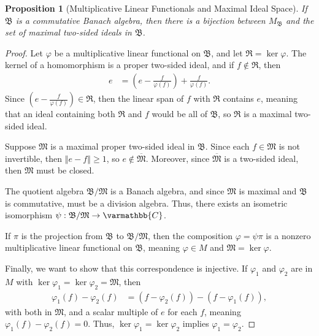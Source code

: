 \documentclass[10pt]{extarticle}
\newcommand{\C}{\mathbb{C}}
\newcommand{\norm}[1]{\left\Vert #1\right\Vert}
\theoremstyle{plain}
\newtheorem*{proposition}{Proposition}
\theoremstyle{definition}
\theoremstyle{note}
\renewcommand*{\mathbb}[1]{\varmathbb{#1}}
\renewcommand{\newline}{\hfill\break}
\begin{document}
\begin{proposition}[Multiplicative Linear Functionals and Maximal Ideal Space]
  If $\mathfrak{B}$ is a commutative Banach algebra, then there is a bijection between $M_{\mathfrak{B}}$ and the set of maximal two-sided ideals in $\mathfrak{B}$.
\end{proposition}
\begin{proof}
  Let $\varphi$ be a multiplicative linear functional on $\mathfrak{B}$, and let $\mathfrak{R} =\ker\varphi$. The kernel of a homomorphism is a proper two-sided ideal, and if $f\notin \mathfrak{R}$, then
  \begin{align*}
    e &= \left(e - \frac{f}{\varphi(f)}\right) + \frac{f}{\varphi\left(f\right)}.
  \end{align*}
  Since $\left(e - \frac{f}{\varphi(f)}\right)\in \mathfrak{R}$, then the linear span of $f$ with $\mathfrak{R}$ contains $e$, meaning that an ideal containing both $\mathfrak{R}$ and $f$ would be all of $\mathfrak{B}$, so $\mathfrak{R}$ is a maximal two-sided ideal.\newline

  Suppose $\mathfrak{M}$ is a maximal proper two-sided ideal in $\mathfrak{B}$. Since each $f\in \mathfrak{M}$ is not invertible, then $\norm{e - f} \geq 1$, so $e\notin \overline{\mathfrak{M}}$. Moreover, since $\overline{\mathfrak{M}}$ is a two-sided ideal, then $\mathfrak{M}$ must be closed.\newline

  The quotient algebra $\mathfrak{B}/\mathfrak{M}$ is a Banach algebra, and since $\mathfrak{M}$ is maximal and $\mathfrak{B}$ is commutative, must be a division algebra. Thus, there exists an isometric isomorphism $\psi: \mathfrak{B}/\mathfrak{M}\rightarrow \C$.\newline

  If $\pi$ is the projection from $\mathfrak{B}$ to $\mathfrak{B}/\mathfrak{M}$, then the composition $\varphi = \psi \pi$ is a nonzero multiplicative linear functional on $\mathfrak{B}$, meaning $\varphi \in M$ and $\mathfrak{M} = \ker\varphi$.\newline

  Finally, we want to show that this correspondence is injective. If $\varphi_1$ and $\varphi_2$ are in $M$ with $\ker\varphi_1 = \ker\varphi_2 = \mathfrak{M}$, then
  \begin{align*}
    \varphi_1(f) - \varphi_2(f) &= \left(f - \varphi_2(f)\right) - \left(f - \varphi_1(f)\right),
  \end{align*}
  with both in $\mathfrak{M}$, and a scalar multiple of $e$ for each $f$, meaning $\varphi_1(f) - \varphi_2(f) = 0$. Thus, $\ker\varphi_1 = \ker\varphi_2 $ implies $\varphi_1 = \varphi_2$.
\end{proof}
\end{document}
